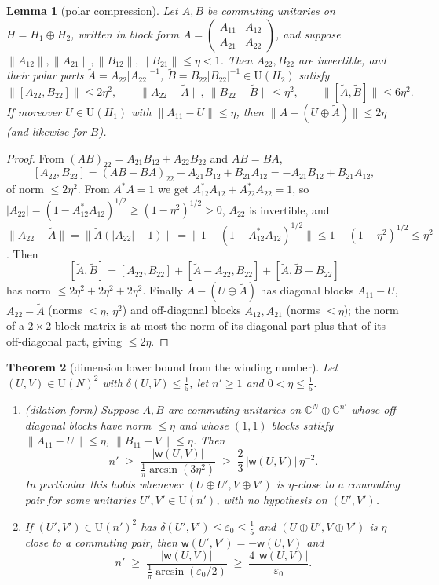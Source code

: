 \documentclass[11pt]{amsart}
\newtheorem{theorem}{Theorem}[section]
\newtheorem{lemma}[theorem]{Lemma}
\theoremstyle{definition}
\theoremstyle{remark}
\newcommand{\C}{\mathbb C}
\newcommand{\wind}{\mathsf w}
\newcommand{\U}{\mathrm U}
\newcommand{\norm}[1]{\lVert #1\rVert}
\begin{document}
\begin{lemma}[polar compression]\label{lem:compression}
Let $A,B$ be commuting unitaries on $H=H_1\oplus H_2$, written in block form $A=\begin{pmatrix}A_{11}&A_{12}\\A_{21}&A_{22}\end{pmatrix}$, and suppose $\norm{A_{12}},\norm{A_{21}},\norm{B_{12}},\norm{B_{21}}\le\eta<1$. Then $A_{22},B_{22}$ are invertible, and their polar parts $\tilde A=A_{22}|A_{22}|^{-1}$, $\tilde B=B_{22}|B_{22}|^{-1}\in\U(H_2)$ satisfy
\[
\norm{[A_{22},B_{22}]}\le2\eta^2,\qquad \norm{A_{22}-\tilde A},\ \norm{B_{22}-\tilde B}\le\eta^2,\qquad \norm{[\tilde A,\tilde B]}\le6\eta^2 .
\]
If moreover $U\in\U(H_1)$ with $\norm{A_{11}-U}\le\eta$, then $\norm{A-(U\oplus\tilde A)}\le2\eta$ (and likewise for $B$).
\end{lemma}

\begin{proof}
From $(AB)_{22}=A_{21}B_{12}+A_{22}B_{22}$ and $AB=BA$,
\[
[A_{22},B_{22}]=(AB-BA)_{22}-A_{21}B_{12}+B_{21}A_{12}=-A_{21}B_{12}+B_{21}A_{12},
\]
of norm $\le2\eta^2$. From $A^*A=1$ we get $A_{12}^*A_{12}+A_{22}^*A_{22}=1$, so $|A_{22}|=(1-A_{12}^*A_{12})^{1/2}\ge(1-\eta^2)^{1/2}>0$, $A_{22}$ is invertible, and $\norm{A_{22}-\tilde A}=\norm{\tilde A(|A_{22}|-1)}=\norm{1-(1-A_{12}^*A_{12})^{1/2}}\le1-(1-\eta^2)^{1/2}\le\eta^2$. Then
\[
[\tilde A,\tilde B]=[A_{22},B_{22}]+[\tilde A-A_{22},B_{22}]+[\tilde A,\tilde B-B_{22}]
\]
has norm $\le2\eta^2+2\eta^2+2\eta^2$. Finally $A-(U\oplus\tilde A)$ has diagonal blocks $A_{11}-U$, $A_{22}-\tilde A$ (norms $\le\eta$, $\eta^2$) and off-diagonal blocks $A_{12},A_{21}$ (norms $\le\eta$); the norm of a $2\times2$ block matrix is at most the norm of its diagonal part plus that of its off-diagonal part, giving $\le2\eta$.
\end{proof}

\begin{theorem}[dimension lower bound from the winding number]\label{thm:lower}
Let $(U,V)\in\U(N)^2$ with $\delta(U,V)\le\frac15$, let $n'\ge1$ and $0<\eta\le\frac15$.
\begin{enumerate}[label=\textup{(\alph*)},leftmargin=2.5em]
\item \textup{(dilation form)} Suppose $A,B$ are commuting unitaries on $\C^N\oplus\C^{n'}$ whose off-diagonal blocks have norm $\le\eta$ and whose $(1,1)$ blocks satisfy $\norm{A_{11}-U}\le\eta$, $\norm{B_{11}-V}\le\eta$. Then
\[
n'\;\ge\;\frac{|\wind(U,V)|}{\frac1\pi\arcsin(3\eta^2)}\;\ge\;\frac23\,|\wind(U,V)|\,\eta^{-2}.
\]
In particular this holds whenever $(U\oplus U',V\oplus V')$ is $\eta$-close to a commuting pair for \emph{some} unitaries $U',V'\in\U(n')$, with no hypothesis on $(U',V')$.
\item If $(U',V')\in\U(n')^2$ has $\delta(U',V')\le\varepsilon_0\le\frac15$ and $(U\oplus U',V\oplus V')$ is $\eta$-close to a commuting pair, then $\wind(U',V')=-\wind(U,V)$ and
\[
n'\;\ge\;\frac{|\wind(U,V)|}{\frac1\pi\arcsin(\varepsilon_0/2)}\;\ge\;\frac{4\,|\wind(U,V)|}{\varepsilon_0}.
\]
\end{enumerate}
\end{theorem}
\end{document}
